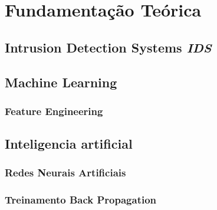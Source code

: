 \chapter[Fundamentação Teórica]{Fundamentação Teórica}

\section{Intrusion Detection Systems \textit{IDS}}
    
\section{Machine Learning}
    \subsection{Feature Engineering}

\section{Inteligencia artificial}
    \subsection{Redes Neurais Artificiais}
        
    \subsection{Treinamento Back Propagation}
        